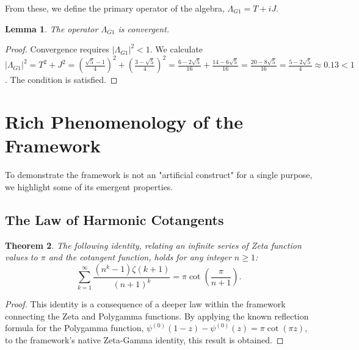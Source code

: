 \documentclass{amsart}
\theoremstyle{plain}
\newtheorem{theorem}{Theorem}
\newtheorem{lemma}[theorem]{Lemma}
\theoremstyle{definition}
\theoremstyle{remark}
\begin{document}
From these, we define the primary operator of the algebra, $\Lambda_{G1} = T+iJ$.
\begin{lemma}
The operator $\Lambda_{G1}$ is convergent.
\end{lemma}
\begin{proof}
Convergence requires $|\Lambda_{G1}|^2 < 1$. We calculate $|\Lambda_{G1}|^2 = T^2+J^2 = \left(\frac{\sqrt{5}-1}{4}\right)^2 + \left(\frac{3-\sqrt{5}}{4}\right)^2 = \frac{6-2\sqrt{5}}{16} + \frac{14-6\sqrt{5}}{16} = \frac{20-8\sqrt{5}}{16} = \frac{5-2\sqrt{5}}{4} \approx 0.13 < 1$. The condition is satisfied.
\end{proof}

\section{Rich Phenomenology of the Framework}
To demonstrate the framework is not an "artificial construct" for a single purpose, we highlight some of its emergent properties.

\subsection{The Law of Harmonic Cotangents}
\begin{theorem}\label{thm:cotangents}
The following identity, relating an infinite series of Zeta function values to $\pi$ and the cotangent function, holds for any integer $n \ge 1$:
\[ \sum_{k=1}^{\infty} \frac{(n^k-1)\zeta(k+1)}{(n+1)^k} = \pi \cot\left(\frac{\pi}{n+1}\right). \]
\end{theorem}
\begin{proof}
This identity is a consequence of a deeper law within the framework connecting the Zeta and Polygamma functions. By applying the known reflection formula for the Polygamma function, $\psi^{(0)}(1-z) - \psi^{(0)}(z) = \pi \cot(\pi z)$, to the framework's native Zeta-Gamma identity, this result is obtained.
\end{proof}
\end{document}
